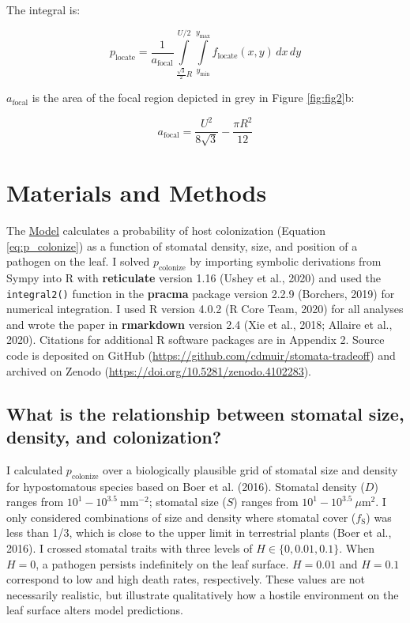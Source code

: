 \documentclass[utf8]{frontiersSCNS}
\newcommand{\fs}{$f_\text{S}$}
\begin{document}
The integral is:

\begin{equation}
  p_\text{locate} = \frac{1}{a_\text{focal}}\int\limits_{\frac{\sqrt{3}}{2} R} ^ {U / 2} \int\limits_{y_\mathrm{min}} ^ {y_\mathrm{max}} f_\text{locate}(x, y) \,dx \,dy
\end{equation}

\(a_\text{focal}\) is the area of the focal region depicted in grey in
Figure \ref{fig:fig2}b:

\[ a_\text{focal} = \frac{U ^ 2}{8 \sqrt{3}} - \frac{\pi R ^ 2}{12} \]

\hypertarget{materials-and-methods}{%
\section*{Materials and Methods}\label{materials-and-methods}}

The \protect\hyperlink{model}{Model} calculates a probability of host
colonization (Equation \ref{eq:p_colonize}) as a function of stomatal
density, size, and position of a pathogen on the leaf. I solved
\(p_\text{colonize}\) by importing symbolic derivations from Sympy into
R with \textbf{reticulate} version 1.16 (Ushey et al., 2020) and used
the \texttt{integral2()} function in the \textbf{pracma} package version
2.2.9 (Borchers, 2019) for numerical integration. I used R version 4.0.2
(R Core Team, 2020) for all analyses and wrote the paper in
\textbf{rmarkdown} version 2.4 (Xie et al., 2018; Allaire et al., 2020).
Citations for additional R software packages are in Appendix 2. Source
code is deposited on GitHub
(\url{https://github.com/cdmuir/stomata-tradeoff}) and archived on
Zenodo (\url{https://doi.org/10.5281/zenodo.4102283}).

\hypertarget{what-is-the-relationship-between-stomatal-size-density-and-colonization}{%
\subsection*{What is the relationship between stomatal size, density,
and
colonization?}\label{what-is-the-relationship-between-stomatal-size-density-and-colonization}}

I calculated \(p_\text{colonize}\) over a biologically plausible grid of
stomatal size and density for hypostomatous species based on Boer et al.
(2016). Stomatal density (\(D\)) ranges from
\(10^1 - 10^{3.5}~\text{mm}^{-2}\); stomatal size (\(S\)) ranges from
\(10^1 - 10^{3.5}~\mu\text{m}^2\). I only considered combinations of
size and density where stomatal cover (\fs) was less than 1/3, which is
close to the upper limit in terrestrial plants (Boer et al., 2016). I
crossed stomatal traits with three levels of \(H \in \{0, 0.01, 0.1\}\).
When \(H = 0\), a pathogen persists indefinitely on the leaf surface.
\(H = 0.01\) and \(H = 0.1\) correspond to low and high death rates,
respectively. These values are not necessarily realistic, but illustrate
qualitatively how a hostile environment on the leaf surface alters model
predictions.
\end{document}
